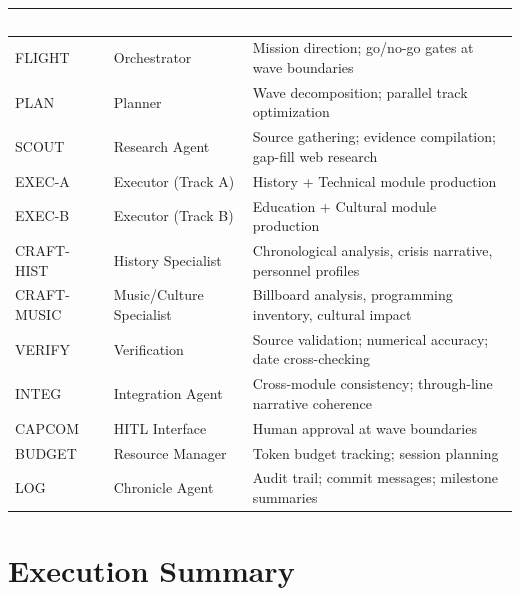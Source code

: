 \documentclass[11pt,letterpaper]{article}
\newcommand{\tableheader}[1]{\textbf{\sffamily\textcolor{white}{#1}}}
\begin{document}
\begin{center}
\begin{tabularx}{\textwidth}{L{2.5cm}L{2.5cm}X}
\toprule
{}
\tableheader{Role} & \tableheader{Agent} & \tableheader{Responsibility} \\
\midrule
FLIGHT & Orchestrator & Mission direction; go/no-go gates at wave boundaries \\
PLAN & Planner & Wave decomposition; parallel track optimization \\
SCOUT & Research Agent & Source gathering; evidence compilation; gap-fill web research \\
EXEC-A & Executor (Track A) & History + Technical module production \\
EXEC-B & Executor (Track B) & Education + Cultural module production \\
CRAFT-HIST & History Specialist & Chronological analysis, crisis narrative, personnel profiles \\
CRAFT-MUSIC & Music/Culture Specialist & Billboard analysis, programming inventory, cultural impact \\
VERIFY & Verification & Source validation; numerical accuracy; date cross-checking \\
INTEG & Integration Agent & Cross-module consistency; through-line narrative coherence \\
CAPCOM & HITL Interface & Human approval at wave boundaries \\
BUDGET & Resource Manager & Token budget tracking; session planning \\
LOG & Chronicle Agent & Audit trail; commit messages; milestone summaries \\
\bottomrule
\end{tabularx}
\end{center}

\section{Execution Summary}
\end{document}
